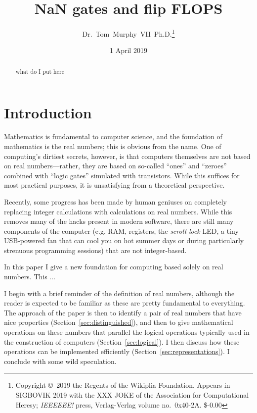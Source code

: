 \documentclass[twocolumn]{article}
\begin{document}
 

\title{NaN gates and flip FLOPS}
\author{Dr.~Tom~Murphy~VII~Ph.D.\footnote{
Copyright \copyright\ 2019 the Regents of the Wikiplia
Foundation. Appears in SIGBOVIK 2019 with the
XXX JOKE
of the Association for Computational Heresy; 
{\em IEEEEEE!} press, Verlag-Verlag volume no.~0x40-2A.
\$-0.00 } }

\renewcommand\th{\ensuremath{{}^{\textrm{th}}}}
\newcommand\st{\ensuremath{{}^{\textrm{st}}}}
\newcommand\rd{\ensuremath{{}^{\textrm{rd}}}}
\newcommand\nd{\ensuremath{{}^{\textrm{nd}}}}
\newcommand\at{\ensuremath{\scriptstyle @}}

\date{1 April 2019}

\maketitle \thispagestyle{empty}

\begin{abstract}
what do I put here
\end{abstract}

\section*{Introduction}

Mathematics is fundamental to computer science, and the foundation of
mathematics is the real numbers; this is obvious from the name. One of
computing's dirtiest secrets, however, is that computers themselves
are not based on real numbers---rather, they are based on so-called
``ones'' and ``zeroes'' combined with ``logic gates'' simulated with
transistors. While this suffices for most practical purposes, it is
unsatisfying from a theoretical perspective.

Recently, some progress has been made by human geniuses on completely
replacing integer calculations with calculations on real
numbers\cite{fluint8}. While this removes many of the hacks present in
modern software, there are still many components of the computer (e.g.
RAM, registers, the {\it scroll lock} LED, a tiny USB-powered fan that
can cool you on hot summer days or during particularly strenuous
programming sessions) %
that are not integer-based.

In this paper I give a new foundation for computing based solely on
real numbers. This ...

I begin with a brief reminder of the definition of real numbers,
although the reader is expected to be familiar as these are pretty
fundamental to everything. The approach of the paper is then to
identify a pair of real numbers that have nice properties
(Section~\ref{sec:distinguished}), and then to give mathematical
operations on these numbers that parallel the logical operations
typically used in the construction of computers
(Section~\ref{sec:logical}). I then discuss how these operations
can be implemented efficiently (Section~\ref{sec:representations}).
I conclude with some wild speculation.
\end{document}
